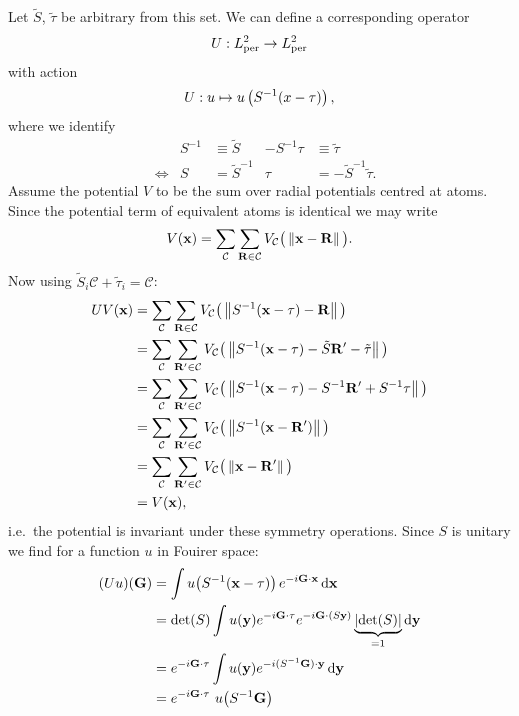 \documentclass[a4paper]{article}
\begin{document}
Let $\tilde{S}$, $\tilde{\tau}$ be arbitrary from this set.
We can define a corresponding operator
\[ U : L^2_\text{per} \to L^2_\text{per} \]
with action
\[
	U : u \mapsto u\left( S^{-1} (x-\tau) \right),
\]
where we identify
\begin{align*}
	&& S^{-1} &\equiv \tilde{S} & -S^{-1}\tau &\equiv \tilde{\tau} \\
	&\Leftrightarrow &  S &= \tilde{S}^{-1} & \tau &= -\tilde{S}^{-1}\tilde{\tau}.
\end{align*}
Assume the potential $V$ to be the sum over radial potentials centred at atoms.
Since the potential term of equivalent atoms is identical we may write
\[
	V(\mathbf{x}) = \sum_{\mathcal{C}} \sum_{\mathbf{R} \in \mathcal{C}}
		V_{\mathcal{C}}\big(\left\lVert\mathbf{x} - \mathbf{R}\right\rVert\big).
\]
Now using $\tilde{S}_i \mathcal{C} + \tilde{\tau}_i = \mathcal{C}$:
\begin{equation}
	\begin{aligned}
		U V(\mathbf{x}) &= \sum_{\mathcal{C}} \sum_{\mathbf{R} \in \mathcal{C}}
			V_{\mathcal{C}}\big(\left\lVert S^{-1} (\mathbf{x} - \tau) - \mathbf{R}\right\rVert\big) \\
		&= \sum_{\mathcal{C}} \sum_{\mathbf{R}' \in \mathcal{C}}
			V_{\mathcal{C}}\big(\left\lVert S^{-1} (\mathbf{x} - \tau) - \tilde{S}\mathbf{R}' - \tilde{\tau}\right\rVert\big) \\
		&= \sum_{\mathcal{C}} \sum_{\mathbf{R}' \in \mathcal{C}}
		V_{\mathcal{C}}\big(\left\lVert S^{-1} (\mathbf{x} - \tau) - S^{-1}\mathbf{R}' + S^{-1} \tau\right\rVert\big) \\
		&= \sum_{\mathcal{C}} \sum_{\mathbf{R}' \in \mathcal{C}}
		V_{\mathcal{C}}\big(\left\lVert S^{-1} (\mathbf{x} - \mathbf{R}')\right\rVert\big) \\
		&= \sum_{\mathcal{C}} \sum_{\mathbf{R}' \in \mathcal{C}}
		V_{\mathcal{C}}\big(\left\lVert\mathbf{x} - \mathbf{R}'\right\rVert\big) \\
		&= V(\mathbf{x}),
	\end{aligned}
	\label{eqn:Potential}
\end{equation}
i.e.~the potential is invariant under these symmetry operations.
Since $S$ is unitary we find for a function $u$ in Fouirer space:
\begin{equation}
\begin{aligned}
	\left( U u \right)\!(\mathbf{G})
	&= \int u\!\left( S^{-1} (\mathbf{x} - \mathbf{\tau}) \right)
	e^{-i \mathbf{G} \cdot \mathbf{x}} \mathop{}\!\mathrm{d} \mathbf{x}\\
	&= \det(S) \int u(\mathbf{y}) e^{-i \mathbf{G} \cdot \tau}
	e^{-i \mathbf{G} \cdot (S \mathbf{y})} \underbrace{\left\lvert\det(S)\right\rvert}_{= 1} \mathop{}\!\mathrm{d} \mathbf{y} \\
	&= e^{-i \mathbf{G} \cdot \tau} \int u(\mathbf{y})
	e^{-i (S^{-1} \mathbf{G}) \cdot \mathbf{y}} \mathop{}\!\mathrm{d} \mathbf{y} \\
	&= e^{-i \mathbf{G} \cdot \mathbf{\tau}}\  u\!\left( S^{-1} \mathbf{G} \right)
\end{aligned}
\label{eqn:ukFourier}
\end{equation}
\end{document}
